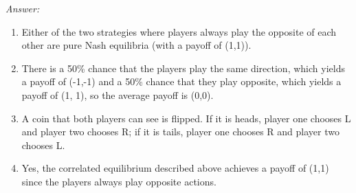 \documentclass{article}
\theoremstyle{definition}
\newenvironment{answer}{\noindent\textit{Answer:}}{}
\begin{document}
\begin{answer}
    \begin{enumerate}
        \item Either of the two strategies where players always play the opposite of each other are pure Nash equilibria (with a payoff of (1,1)).
        \item There is a 50\% chance that the players play the same direction, which yields a payoff of (-1,-1) and a 50\% chance that they play opposite, which yields a payoff of (1, 1), so the average payoff is (0,0).
        \item A coin that both players can see is flipped. If it is heads, player one chooses L and player two chooses R; if it is tails, player one chooses R and player two chooses L.
        \item Yes, the correlated equilibrium described above achieves a payoff of (1,1) since the players always play opposite actions.
    \end{enumerate} 
\end{answer}
\end{document}
